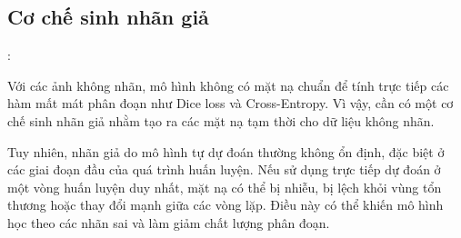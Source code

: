 \subsection{Cơ chế sinh nhãn giả}

\begin{frame}{\secname: \subsecname}

Với các ảnh không nhãn, mô hình không có mặt nạ chuẩn để tính trực tiếp các hàm mất mát phân đoạn như Dice loss và Cross-Entropy. Vì vậy, cần có một cơ chế sinh nhãn giả nhằm tạo ra các mặt nạ tạm thời cho dữ liệu không nhãn.

\bigskip
Tuy nhiên, nhãn giả do mô hình tự dự đoán thường không ổn định, đặc biệt ở các giai đoạn đầu của quá trình huấn luyện. Nếu sử dụng trực tiếp dự đoán ở một vòng huấn luyện duy nhất, mặt nạ có thể bị nhiễu, bị lệch khỏi vùng tổn thương hoặc thay đổi mạnh giữa các vòng lặp. Điều này có thể khiến mô hình học theo các nhãn sai và làm giảm chất lượng phân đoạn.

\end{frame}


